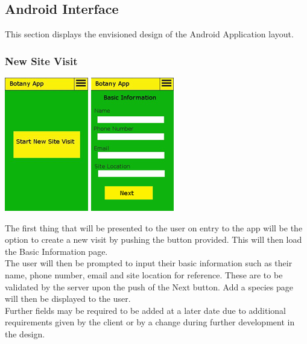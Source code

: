 \subsection{Android Interface}
	This section displays the envisioned design of the Android Application layout.

	\subsubsection{New Site Visit}
		\begin{center}
			\includegraphics[scale=0.5]{uiDesign/botanyAppNewSiteVisit1.png}
			\includegraphics[scale=0.5]{uiDesign/botanyAppNewSiteVisit2.png}
		\end{center}
	
		The first thing that will be presented to the user on entry to the app will be the option to create a new visit by pushing the button provided. This will then load the Basic Information page.\\

		The user will then be prompted to input their basic information such as their name, phone number, email and site location for reference. These are to be validated by the server upon the push of the Next button. Add a species page will then be displayed to the user.\\
	
		Further fields may be required to be added at a later date due to additional requirements given by the client or by a change during further development in the design.\\
	
